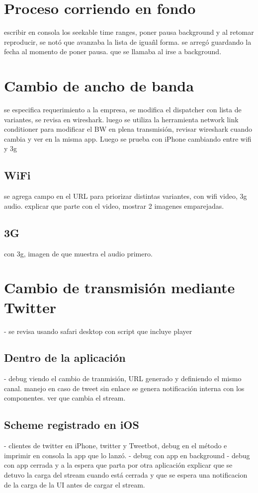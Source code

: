 \section{Proceso corriendo en fondo} %

escribir en consola los seekable time ranges, poner pausa background y al retomar reproducir, se notó que avanzaba la lista de iguañl forma. se arregó guardando la fecha al momento de poner pausa. que se llamaba al irse a background.

\section{Cambio de ancho de banda}

se especifica requerimiento a la empresa, se modifica el dispatcher con lista de variantes, se revisa en wireshark.
luego se utiliza la herramienta network link conditioner para modificar el BW en plena transmisión, revisar wireshark cuando cambia y ver en la misma app.
Luego se prueba con iPhone cambiando entre wifi y 3g

  \subsection{WiFi}
  se agrega campo en el URL para priorizar distintas variantes, con wifi video, 3g audio.
  explicar que parte con el video, mostrar 2 imagenes emparejadas.
  \subsection{3G}
  con 3g, imagen de que muestra el audio primero.
\section{Cambio de transmisión mediante Twitter}
- se revisa usando safari desktop con script que incluye player

  \subsection{Dentro de la aplicación}
	- debug viendo el cambio de tranmisión, URL generado y definiendo el mismo canal. manejo en caso de tweet sin enlace
	se genera notificación interna con los componentes. ver que cambia el stream.
  \subsection{Scheme registrado en iOS}
	- clientes de twitter en iPhone, twitter y Tweetbot, debug en el método e imprimir en consola la app que lo lanzó.  
	- debug con app en background
	- debug con app cerrada y a la espera que parta por otra aplicación
	explicar que se detuvo la carga del stream cuando está cerrada y que se espera una notificacion de la carga de la UI antes de cargar el stream.
  

